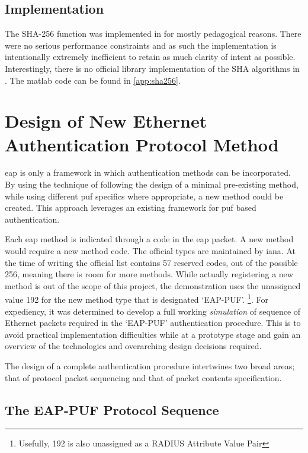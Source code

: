 \subsection{Implementation}

The SHA-256 function was implemented in \matlab for mostly pedagogical reasons.
There were no serious performance constraints and as such the implementation is
intentionally extremely inefficient to retain as much clarity of intent as
possible. Interestingly, there is no official library implementation of the SHA
algorithms in \matlab. The matlab code can be found in \autoref{app:sha256}.

\section{Design of New Ethernet Authentication Protocol Method}

\Gls{eap} is only a framework in which authentication methods can be incorporated.
By using the technique of following the design of a minimal pre-existing method,
while using different \gls{puf} specifics where appropriate, a new method could
be created. This approach leverages an existing framework for \gls{puf} based
authentication.

Each \gls{eap} method is indicated through a code in the \gls{eap} packet.
A new method would require a new method code.
The official types are maintained by \gls{iana}\cite{iana2014eap}.
At the time of writing the official list contains 57 reserved codes, out of the
possible 256, meaning there is room for more methods.
While actually registering a new method is out of the scope of this project, the
demonstration uses the unassigned value 192 for the new method type that is
designated `EAP-PUF'.
\footnote{Usefully, 192 is also unassigned as a RADIUS Attribute Value Pair}.
For expediency, it was determined to develop a full working \emph{simulation}
of sequence of Ethernet packets required in the `EAP-PUF' authentication procedure.
This is to avoid practical implementation difficulties while at a prototype
stage and gain an overview of the technologies and overarching design decisions
required.

The design of a complete authentication procedure intertwines two broad areas;
that of protocol packet sequencing and that of packet contents specification.

\subsection{The EAP-PUF Protocol Sequence}

